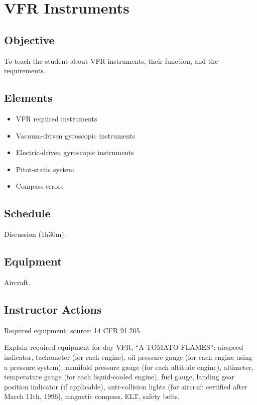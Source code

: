 \section{VFR Instruments}

\subsection{Objective}

To teach the student about VFR instruments, their function, and the
requirements.

\subsection{Elements}

\begin{itemize}
  \item VFR required instruments
  \item Vacuum-driven gyroscopic instruments
  \item Electric-driven gyroscopic instruments
  \item Pitot-static system
  \item Compass errors
\end{itemize}

\subsection{Schedule}

Discussion (1h30m).

\subsection{Equipment}

Aircraft.

\subsection{Instructor Actions}

Required equipment: source: 14 CFR 91.205.

Explain required equipment for day VFR, ``A TOMATO FLAMES'': airspeed
indicator, tachometer (for each engine), oil pressure gauge (for each engine
using a pressure system), manifold pressure gauge (for each altitude engine),
altimeter, temperature gauge (for each liquid-cooled engine), fuel gauge,
landing gear position indicator (if applicable), anti-collision lights (for
aircraft certified after March 11th, 1996), magnetic compass, ELT, safety
belts.


